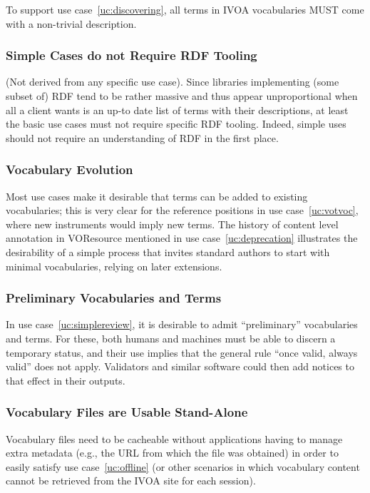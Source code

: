 \documentclass[11pt,a4paper]{ivoa}
\begin{document}
To support use case~\ref{uc:discovering}, all terms in IVOA vocabularies
MUST come with a non-trivial description.

\subsubsection{Simple Cases do not Require RDF Tooling}
\label{req:nordf}

(Not derived from any specific use case).  Since libraries implementing
(some subset of) RDF tend to be rather massive and thus appear
unproportional when all a client wants is an up-to date list of terms
with their descriptions, at least the basic use cases must not require
specific RDF tooling.  Indeed, simple uses should not require an
understanding of RDF in the first place.


\subsubsection{Vocabulary Evolution}
\label{req:evolution}

Most use cases make it desirable that terms can be added to existing
vocabularies; this is very clear for the reference positions in
use case~\ref{uc:votvoc}, where new instruments would imply new
terms.  The history of content level annotation in VOResource mentioned
in use case~\ref{uc:deprecation} illustrates the desirability of a
simple process that invites standard authors to start with minimal
vocabularies, relying on later extensions.

\subsubsection{Preliminary Vocabularies and Terms}
\label{req:preliminary}

In use case~\ref{uc:simplereview}, it is desirable to admit
``preliminary'' vocabularies and terms.  For these, both humans
and machines must be able to discern a temporary status, and
their use implies that the general rule ``once valid, always
valid'' does not apply.  Validators and similar software could
then add notices to that effect in their outputs.

\subsubsection{Vocabulary Files are Usable Stand-Alone}
\label{req:standalone}

Vocabulary files need to be cacheable without applications having to
manage extra metadata (e.g., the URL from which the file was obtained)
in order to easily satisfy use case~\ref{uc:offline} (or other scenarios
in which vocabulary content cannot be retrieved from the IVOA
site for each session).
\end{document}
